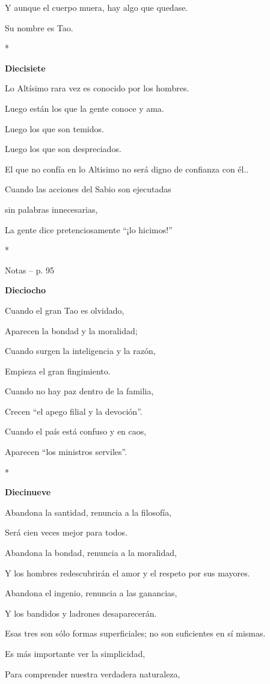 Y aunque el cuerpo muera, hay algo que quedase.

Su nombre es Tao.

*

\textbf{Diecisiete}

Lo Altísimo rara vez es conocido por los hombres.

Luego están los que la gente conoce y ama.

Luego los que son temidos.

Luego los que son despreciados.

El que no confía en lo Altisimo no será digno de confianza con él..

Cuando las acciones del Sabio son ejecutadas

sin palabras innecesarias,

La gente dice pretenciosamente ``¡lo hicimos!''

*

Notas -- p. 95

\textbf{Dieciocho}

Cuando el gran Tao es olvidado,

Aparecen la bondad y la moralidad;

Cuando surgen la inteligencia y la razón,

Empieza el gran fingimiento.

Cuando no hay paz dentro de la familia,

Crecen ``el apego filial y la devoción''.

Cuando el país está confuso y en caos,

Aparecen ``los ministros serviles''.

*

\textbf{Diecinueve}

Abandona la santidad, renuncia a la filosofía,

Será cien veces mejor para todos.

Abandona la bondad, renuncia a la moralidad,

Y los hombres redescubrirán el amor y el respeto por sus mayores.

Abandona el ingenio, renuncia a las ganancias,

Y los bandidos y ladrones desaparecerán.

Esas tres son sólo formas superficiales; no son suficientes en sí
mismas.

Es más importante ver la simplicidad,

Para comprender nuestra verdadera naturaleza,

